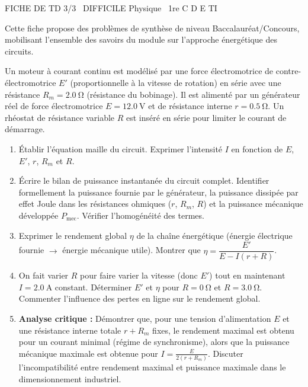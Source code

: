 \documentclass[11pt]{article}
\begin{document}
\begin{tcolorbox}[enhanced,colback=popink,colframe=popink,arc=10pt,boxrule=0pt,left=12pt,right=12pt,top=9pt,bottom=9pt]
{\color{white}\popxbold\small FICHE DE TD 3/3 \textbullet\ DIFFICILE \hfill Physique \textbullet\ 1re C D E TI\par}
\end{tcolorbox}
\vspace{4pt}
Cette fiche propose des problèmes de synthèse de niveau Baccalauréat/Concours, mobilisant l'ensemble des savoirs du module sur l'approche énergétique des circuits.

\begin{exercice}
Un moteur à courant continu est modélisé par une force électromotrice de contre-électromotrice $E'$ (proportionnelle à la vitesse de rotation) en série avec une résistance $R_m = \SI{2,0}{\ohm}$ (résistance du bobinage). Il est alimenté par un générateur réel de force électromotrice $E = \SI{12,0}{\volt}$ et de résistance interne $r = \SI{0,5}{\ohm}$. Un rhéostat de résistance variable $R$ est inséré en série pour limiter le courant de démarrage.
\begin{enumerate}
    \item Établir l'équation maille du circuit. Exprimer l'intensité $I$ en fonction de $E$, $E'$, $r$, $R_m$ et $R$.
    \item Écrire le bilan de puissance instantanée du circuit complet. Identifier formellement la puissance fournie par le générateur, la puissance dissipée par effet Joule dans les résistances ohmiques ($r$, $R_m$, $R$) et la puissance mécanique développée $P_{\text{mec}}$. Vérifier l'homogénéité des termes.
    \item Exprimer le rendement global $\eta$ de la chaîne énergétique (énergie électrique fournie $\to$ énergie mécanique utile). Montrer que $\eta = \dfrac{E'}{E - I(r+R)}$.
    \item On fait varier $R$ pour faire varier la vitesse (donc $E'$) tout en maintenant $I = \SI{2,0}{\ampere}$ constant. Déterminer $E'$ et $\eta$ pour $R = \SI{0}{\ohm}$ et $R = \SI{3,0}{\ohm}$. Commenter l'influence des pertes en ligne sur le rendement global.
    \item \textbf{Analyse critique :} Démontrer que, pour une tension d'alimentation $E$ et une résistance interne totale $r+R_m$ fixes, le rendement maximal est obtenu pour un courant minimal (régime de synchronisme), alors que la puissance mécanique maximale est obtenue pour $I = \frac{E}{2(r+R_m)}$. Discuter l'incompatibilité entre rendement maximal et puissance maximale dans le dimensionnement industriel.
\end{enumerate}
\end{exercice}
\end{document}

